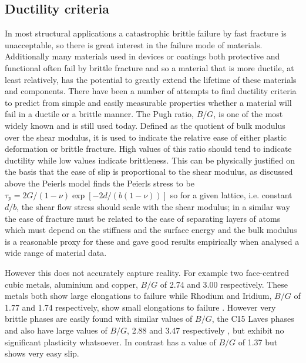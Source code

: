 \newpage

\subsection{Ductility criteria}

 In most structural applications a catastrophic brittle failure by fast fracture is unacceptable, so there is great interest in the failure mode of materials. Additionally many materials used in devices or coatings both protective and functional often fail by brittle fracture and so a material that is more ductile, at least relatively, has the potential to greatly extend the lifetime of these materials and components.
There have been a number of attempts to find ductility criteria to predict from simple and easily measurable properties whether a material will fail in a ductile or a brittle manner.
The Pugh ratio, $B/G$, is one of the most widely known and is still used today. Defined as the quotient of bulk modulus over the shear modulus, it is used to indicate the relative ease of either plastic deformation or brittle fracture. High values of this ratio should tend to indicate ductility while low values indicate brittleness. This can be physically justified on the basis that the ease of slip is proportional to the shear modulus, as discussed above the Peierls model finds the Peierls stress to be $\tau_p = 2G / (1-\nu) \exp[-2d/(b(1-\nu))]$ so for a given lattice, i.e. constant $d/b$, the shear flow stress should scale with the shear modulus; in a similar way the ease of fracture must be related to the ease of separating layers of atoms which must depend on the stiffness and the surface energy and the bulk modulus is a reasonable proxy for these and gave good results empirically when \citet{Pugh1954} analysed a wide range of material data.

However this does not accurately capture reality. For example two face-centred cubic metals, aluminium and copper, $B/G$ of 2.74 and 3.00 respectively. These metals both show large elongations to failure while Rhodium and Iridium, $B/G$ of 1.77 and 1.74 respectively, show small elongations to failure \cite{Pugh1954}. However very brittle phases are easily found with similar values of $B/G$, the C15 Laves phases \cite{Stein2004,Stein2005}  and  also have large values of $B/G$, 2.88 and 3.47 respectively \cite{Chu1995}, but exhibit no significant plasticity whatsoever. In contrast  has a value of $B/G$ of 1.37 \cite{Barsoum2011} but shows very easy slip.



